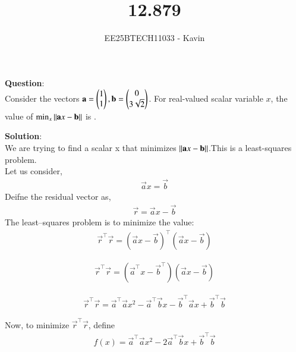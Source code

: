 \documentclass[journal]{IEEEtran}
\begin{document}

\vspace{3cm}

\title{12.879}
\author{EE25BTECH11033 - Kavin}
{\let\newpage\relax\maketitle}

\renewcommand{\thefigure}{\theenumi}
\renewcommand{\thetable}{\theenumi}
\setlength{\intextsep}{10pt} %
\textbf{Question}:\\
Consider the vectors
$\mathbf{a} = \begin{pmatrix}1 \\ 1\end{pmatrix}, \mathbf{b} = \begin{pmatrix}0 \\ 3\sqrt{2}\end{pmatrix}$.
For real-valued scalar variable $x$, the value of
$\min_{x} \left\lVert\mathbf{a}x - \mathbf{b}\right\rVert$
is \underline{\hspace{1cm}}.\\    
\bigskip

\textbf{Solution}:\\
We are trying to find a scalar x that minimizes $\left\lVert\mathbf{a}x - \mathbf{b}\right\rVert$.This is a least-squares problem.\\

Let us consider,
\begin{align}
\vec{a}x = \vec{b}
\end{align}
Deifne the residual vector as,
\begin{align}
\vec{r} =\vec{a}x -  \vec{b} 
\end{align}
The least--squares problem is to minimize the value:
\begin{align}
\vec{r}^{\top} \vec{r} = (\vec{a}x -  \vec{b})^{\top}(\vec{a}x -  \vec{b})
\end{align}

\begin{align}
\vec{r}^{\top} \vec{r}= (\vec{a}^{\top}x -  \vec{b}^{\top})(\vec{a}x -  \vec{b})
\end{align}

\begin{align}
\vec{r}^{\top} \vec{r}= \vec{a}^{\top}\vec{a}x^2 - \vec{a}^{\top}\vec{b} x - \vec{b}^{\top}\vec{a}x + \vec{b}^{\top}\vec{b}
\end{align}

Now, to minimize \(\vec{r}^{\top}\vec{r}\), define
\begin{align}
f(x) = \vec{a}^{\top}\vec{a}x^2 - 2\vec{a}^{\top}\vec{b} x + \vec{b}^{\top}\vec{b}
\end{align}
\end{document}
